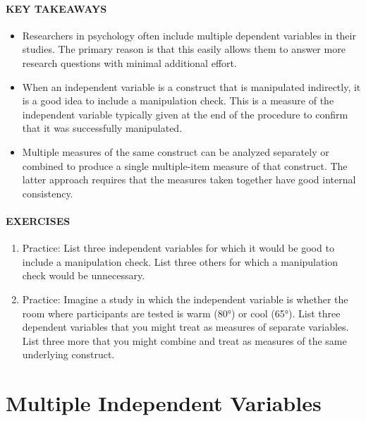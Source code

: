 \documentclass[
]{krantz}
\providecommand{\tightlist}{%
  \setlength{\itemsep}{0pt}\setlength{\parskip}{0pt}}
\begin{document}
\hypertarget{key-takeaways-19}{%
\paragraph*{KEY TAKEAWAYS}\label{key-takeaways-19}}

\begin{itemize}
\tightlist
\item
  Researchers in psychology often include multiple dependent variables in their studies. The primary reason is that this easily allows them to answer more research questions with minimal additional effort.
\item
  When an independent variable is a construct that is manipulated indirectly, it is a good idea to include a manipulation check. This is a measure of the independent variable typically given at the end of the procedure to confirm that it was successfully manipulated.
\item
  Multiple measures of the same construct can be analyzed separately or combined to produce a single multiple-item measure of that construct. The latter approach requires that the measures taken together have good internal consistency.
\end{itemize}

\hypertarget{exercises-17}{%
\paragraph*{EXERCISES}\label{exercises-17}}

\begin{enumerate}
\def\labelenumi{\arabic{enumi}.}
\tightlist
\item
  Practice: List three independent variables for which it would be good to include a manipulation check. List three others for which a manipulation check would be unnecessary.
\item
  Practice: Imagine a study in which the independent variable is whether the room where participants are tested is warm (80°) or cool (65°). List three dependent variables that you might treat as measures of separate variables. List three more that you might combine and treat as measures of the same underlying construct.
\end{enumerate}

\hypertarget{multiple-independent-variables}{%
\section{Multiple Independent Variables}\label{multiple-independent-variables}}
\end{document}
